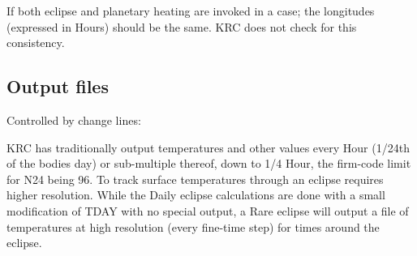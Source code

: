 \documentclass{article}
\begin{document}
 If both eclipse and planetary heating are invoked in a case; the longitudes
 (expressed in Hours) should be the same. KRC does not check for this
 consistency.


\subsection{Output files \label{tline}}
Controlled by change lines:

KRC has traditionally output temperatures and other values every Hour (1/24th of
the bodies day) or sub-multiple thereof, down to 1/4 Hour, the firm-code limit
for N24 being 96. To track surface temperatures through an eclipse requires
higher resolution. While the Daily eclipse calculations are done with a small
modification of TDAY with no special output, a Rare eclipse will output a file
of temperatures at high resolution (every fine-time step) for times around the
eclipse.
\end{document}
